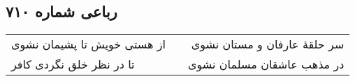 \begin{center}
\section*{رباعی شماره ۷۱۰}
\label{sec:sh710}
\begin{longtable}{l p{0.5cm} r}
از هستی خویش تا پشیمان نشوی
&&
سر حلقهٔ عارفان و مستان نشوی
\\
تا در نظر خلق نگردی کافر
&&
در مذهب عاشقان مسلمان نشوی
\\
\end{longtable}
\end{center}
